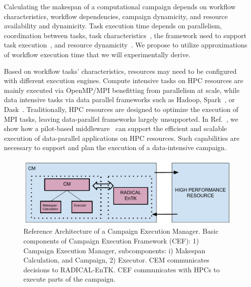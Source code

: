 Calculating the makespan of a computational campaign depends on workflow 
characteristics, workflow dependencies, campaign dynamicity, and resource 
availability and dynamicity. Task execution time depends on parallelism, 
coordination between tasks, task characteristics~\cite{khoshlessan2017parallel}, 
the framework used to support task execution~\cite{paraskevakos2018task}, and 
resource dynamicity~\cite{paraskevakos2019workflow}. We propose to utilize 
approximations of workflow execution time that we will experimentally derive.

Based on workflow tasks’ characteristics, resources may need to be configured 
with different execution engines. Compute intensive tasks on HPC resources are 
mainly executed via OpenMP/MPI benefitting from parallelism at scale, while data 
intensive tasks via data parallel frameworks such as Hadoop, Spark~\cite{zaharia2010spark}, 
or Dask~\cite{rocklin2015dask}. Traditionally, HPC resources are designed to 
optimize the execution of MPI tasks, leaving data-parallel frameworks largely 
unsupported. In Ref.~\cite{luckow2016hadoop}, we show how a pilot-based 
middleware~\cite{merzky2019using} can support the efficient and scalable execution 
of data-parallel applications on HPC resources. Such capabilities are necessary 
to support and plan the execution of a data-intensive campaign.

\begin{figure}[t]
	\centering
	\includegraphics[width=.85\textwidth]{CEM_RefArch.pdf}
    \caption{Reference Architecture of a Campaign Execution Manager. Basic 
    components of Campaign Execution Framework (CEF): 1) Campaign Execution 
    Manager, subcomponents: i) Makespan Calculation, and Campaign, 2) Executor. 
    CEM communicates decisions to RADICAL-EnTK. CEF communicates with HPCs to 
    execute parts of the campaign.}\label{refarch}
\end{figure}

